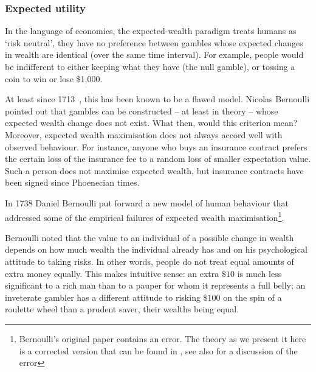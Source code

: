 \subsubsection{Expected utility}
%
%
In the language of economics, the expected-wealth paradigm treats humans as 
`risk neutral', \ie they have no preference between gambles whose expected 
changes in wealth are identical (over the same time interval). For example, 
people would be indifferent to either keeping what they have (the null gamble), or tossing a coin to 
win or lose \$1,000.

At least since 
1713~\cite[p.~402]{Montmort1713}, this has been known to be a flawed model. 
Nicolas Bernoulli pointed out that gambles can be constructed -- at least in theory --
whose expected wealth change does not exist. What then, would this criterion mean?
Moreover, expected wealth maximisation does not always  accord 
well with observed behaviour. For instance, anyone who buys an insurance contract
prefers the certain loss of the insurance fee to a random loss
of smaller expectation value. Such a person does not maximise expected wealth, but 
insurance contracts have been signed since Phoenecian times.

In 1738 Daniel Bernoulli put forward a new model of human behaviour that addressed
some of the empirical failures of expected wealth maximisation\footnote{Bernoulli's original paper contains an error. The theory as we present it here is a corrected version that can be found in \cite{Laplace1814}, see also \cite{Peters2019} for a discussion of the error}. 

Bernoulli noted that the value to an 
individual of a possible change in wealth depends on how much wealth the individual already 
has and on his psychological attitude to taking risks. In other words, people do not 
treat equal amounts of extra money equally. This makes intuitive sense: an extra 
$\$10$ is much less significant to a rich man than to a pauper for whom it 
represents a full belly; an inveterate gambler has a different attitude to risking 
$\$100$ on the spin of a roulette wheel than a prudent saver, their wealths 
being equal.

